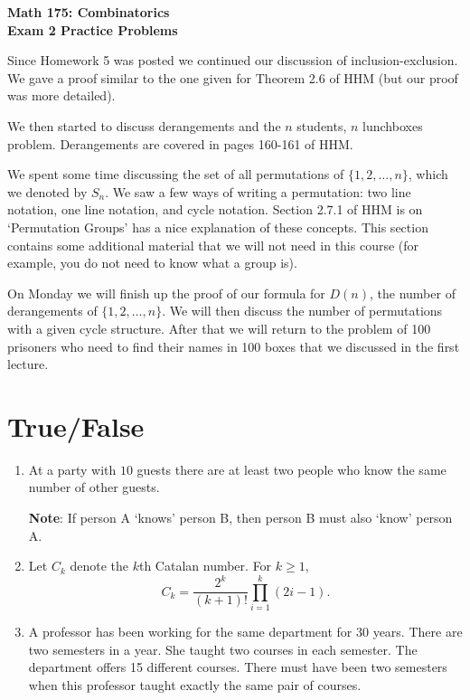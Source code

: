 \documentclass[11pt]{article}
\begin{document}
\begin{center}
{\Large \bf Math 175: Combinatorics} \\
{\large \bf Exam 2 Practice Problems}
\end{center}

Since Homework 5 was posted we continued our discussion of inclusion-exclusion.  We gave a proof similar to the one given for Theorem 2.6 of HHM (but our proof was more detailed).  

We then started to discuss derangements and the $n$ students, $n$ lunchboxes problem.  Derangements are covered in pages 160-161 of HHM.  

We spent some time discussing the set of all permutations of $\{1,2,\ldots, n\}$, which we denoted by $S_n$.  We saw a few ways of writing a permutation: two line notation, one line notation, and cycle notation. Section 2.7.1 of HHM is on `Permutation Groups' has a nice explanation of these concepts.  This section contains some additional material that we will not need in this course (for example, you do not need to know what a group is).

On Monday we will finish up the proof of our formula for $D(n)$, the number of derangements of $\{1,2,\ldots, n\}$.  We will then discuss the number of permutations with a given cycle structure.  After that we will return to the problem of 100 prisoners who need to find their names in 100 boxes that we discussed in the first lecture.
  

\section{True/False}

\begin{enumerate}

\item At a party with $10$ guests there are at least two people who know the same number of other guests.

{\bf Note}: If person A `knows' person B, then person B must also `know' person A.




\item Let $C_k$ denote the $k$th Catalan number.  For $k \ge 1$,
\[
C_k = \frac{2^k}{(k+1)!} \prod_{i=1}^k (2i-1).
\]

\item A professor has been working for the same department for 30 years.  There are two semesters in a year.  She taught two courses in each semester.  The department offers 15 different courses.  There must have been two semesters when this professor taught exactly the same pair of courses.

\end{enumerate}
\end{document}
